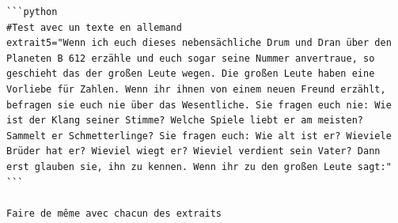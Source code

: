\documentclass[
]{article}
\begin{document}
\begin{verbatim}
```python
#Test avec un texte en allemand
extrait5="Wenn ich euch dieses nebensächliche Drum und Dran über den Planeten B 612 erzähle und euch sogar seine Nummer anvertraue, so geschieht das der großen Leute wegen. Die großen Leute haben eine Vorliebe für Zahlen. Wenn ihr ihnen von einem neuen Freund erzählt, befragen sie euch nie über das Wesentliche. Sie fragen euch nie: Wie ist der Klang seiner Stimme? Welche Spiele liebt er am meisten? Sammelt er Schmetterlinge? Sie fragen euch: Wie alt ist er? Wieviele Brüder hat er? Wieviel wiegt er? Wieviel verdient sein Vater? Dann erst glauben sie, ihn zu kennen. Wenn ihr zu den großen Leute sagt:"
```

Faire de même avec chacun des extraits
\end{verbatim}
\end{document}
